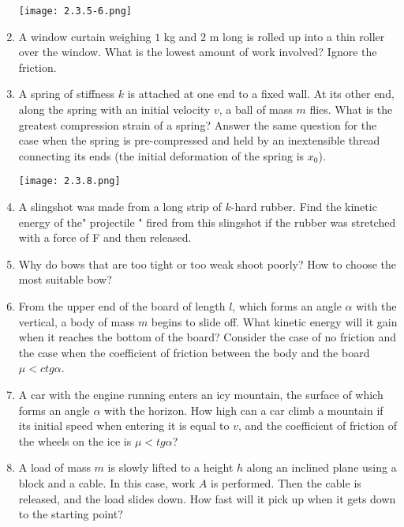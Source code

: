 \documentclass{article}
\begin{document}
\begin{enumerate}[label=2.3.\arabic*]
\begin{center}
    \texttt{[image: 2.3.5-6.png]}
\end{center}

\item A window curtain weighing $1$ kg and $2$ m long is rolled up into a thin roller over the window. What is the lowest amount of work involved? Ignore the friction.

\item A spring of stiffness $k$ is attached at one end to a fixed wall. At its other end, along the spring with an initial velocity $v$, a ball of mass $m$ flies. What is the greatest compression strain of a spring? Answer the same question for the case when the spring is pre-compressed and held by an inextensible thread connecting its ends (the initial deformation of the spring is $x_0$).

\begin{center}
    \texttt{[image: 2.3.8.png]}
\end{center}


\item A slingshot was made from a long strip of $k$-hard rubber. Find the kinetic energy of the" projectile " fired from this slingshot if the rubber was stretched with a force of F and then released.

\item Why do bows that are too tight or too weak shoot poorly? How to choose the most suitable bow?

\item From the upper end of the board of length $l$, which forms an angle $\alpha$ with the vertical, a body of mass $m$ begins to slide off. What kinetic energy will it gain when it reaches the bottom of the board? Consider the case of no friction and the case when the coefficient of friction between the body and the board $\mu < ctg \alpha$.

\item A car with the engine running enters an icy mountain, the surface of which forms an angle $\alpha$ with the horizon. How high can a car climb a mountain if its initial speed when entering it is equal to $v$, and the coefficient of friction of the wheels on the ice is $\mu < tg \alpha$?

\item A load of mass $m$ is slowly lifted to a height $h$ along an inclined plane using a block and a cable. In this case, work $A$ is performed. Then the cable is released, and the load slides down. How fast will it pick up when it gets down to the starting point?


\end{enumerate}
\end{document}
